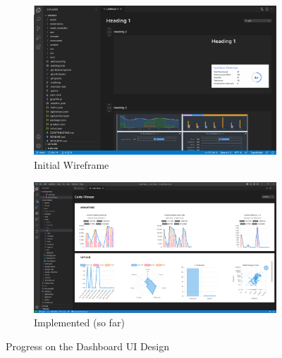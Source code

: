 \documentclass{prrcs}
\begin{document}
\begin{figure}[h]
    \centering
    \begin{subfigure}[b]{0.22\textwidth}
        \centering
        \includegraphics[width=\textwidth]{initialwf.pdf}
        \caption*{{\footnotesize Initial Wireframe}}
    \end{subfigure}
    \hfill
    \begin{subfigure}[b]{0.25\textwidth}  
        \centering 
        \includegraphics[width=\textwidth]{screenshot_27-02.png}
        \caption*{{\footnotesize Implemented (so far)}}
    \end{subfigure}
    \caption{Progress on the Dashboard UI Design} 
\end{figure}
\end{document}
